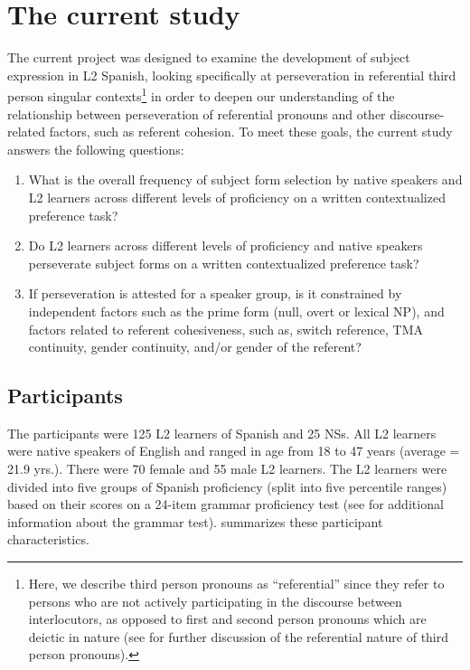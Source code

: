 \documentclass[output=paper]{langscibook}
\begin{document}
\section{The current study}\label{sec:geeslin:5}



The current project was designed to examine the development of subject expression in L2 Spanish, looking specifically at perseveration in referential third person singular contexts\footnote{Here, we describe third person pronouns as “referential” since they refer to persons who are not actively participating in the discourse between interlocutors, as opposed to first and second person pronouns which are deictic in nature (see \citealt{dePradaPérez2020} for further discussion of the referential nature of third person pronouns).} in order to deepen our understanding of the relationship between perseveration of referential pronouns and other discourse-related factors, such as referent cohesion. To meet these goals, the current study answers the following questions:


\begin{enumerate}
 \item What is the overall frequency of subject form selection by native speakers and L2 learners across different levels of proficiency on a written contextualized preference task?

 \item Do L2 learners across different levels of proficiency and native speakers perseverate subject forms on a written contextualized preference task?

 \item If perseveration is attested for a speaker group, is it constrained by independent factors such as the prime form (null, overt or lexical NP), and factors related to referent cohesiveness, such as, switch reference, TMA continuity, gender continuity, and/or gender of the referent?

\end{enumerate}

\subsection{Participants}\label{sec:geeslin:5.1}

The participants were 125 L2 learners of Spanish and 25 NSs. All L2 learners were native speakers of English and ranged in age from 18 to 47 years (average = 21.9 yrs.). There were 70 female and 55 male L2 learners. The L2 learners were divided into five groups of Spanish proficiency (split into five percentile ranges) based on their scores on a 24-item grammar proficiency test (see  for additional information about the grammar test).  summarizes these participant characteristics.
\end{document}
